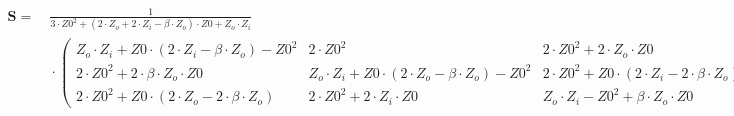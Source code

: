 $\begin{alignedat}{1}\mathbf{S}= & \:\frac{1}{3\cdot Z0^2+ (2\cdot
Z_o+2\cdot Z_i-\beta\cdot Z_o )\cdot Z0+Z_o\cdot Z_i}\\ & \:\cdot
\left(\begin{smallmatrix} Z_o\cdot Z_i+Z0\cdot  (2\cdot Z_i-\beta\cdot
Z_o )-Z0^2 & 2\cdot Z0^2 & 2\cdot Z0^2+2\cdot Z_o\cdot Z0 \\ 2\cdot
Z0^2+2\cdot \beta\cdot Z_o\cdot Z0 & Z_o\cdot Z_i+Z0\cdot  (2\cdot
Z_o-\beta\cdot Z_o )-Z0^2 & 2\cdot Z0^2+Z0\cdot  (2\cdot Z_i-2\cdot
\beta\cdot Z_o ) \\ 2\cdot Z0^2+Z0\cdot  (2\cdot Z_o-2\cdot \beta\cdot
Z_o ) & 2\cdot Z0^2+2\cdot Z_i\cdot Z0 & Z_o\cdot Z_i-Z0^2+\beta\cdot
Z_o\cdot Z0 \end{smallmatrix}\right)\end{alignedat}$
